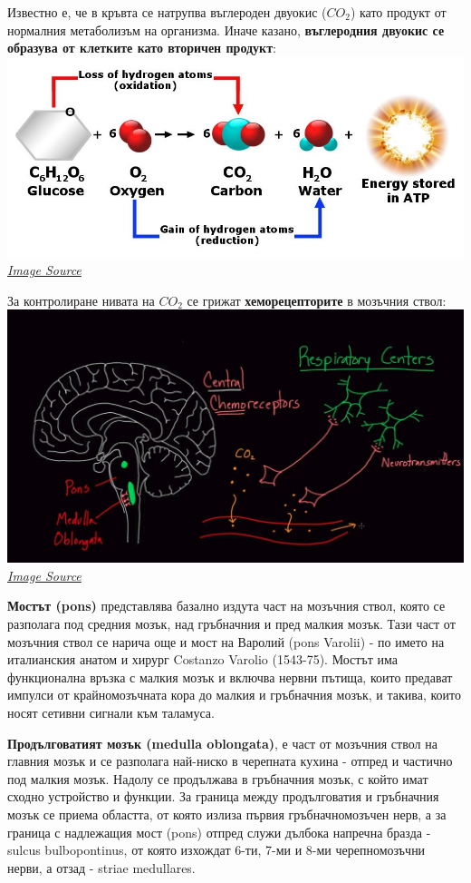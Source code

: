 \documentclass[11pt]{article}
\makeatletter
\def\maxwidth{\ifdim\Gin@nat@width>\linewidth\linewidth
    \else\Gin@nat@width\fi}
\let\Oldincludegraphics\includegraphics
\renewcommand{\includegraphics}[1]{\Oldincludegraphics[width=.8\maxwidth]{#1}}
\makeatother
\begin{document}
    Известно е, че в кръвта се натрупва въглероден двуокис (\(CO_2\)) като
продукт от нормалния метаболизъм на организма. Иначе казано,
\textbf{въглеродния двуокис се образува от клетките като вторичен
продукт}: \includegraphics{img/Reactions-of-Cellular-Respiration.jpg}
\emph{\href{https://www.scienceabc.com/humans/why-does-the-human-body-release-carbon-dioxide.html}{Image
Source}}

    За контролиране нивата на \(CO_2\) се грижат \textbf{хеморецепторите} в
мозъчния ствол:
\includegraphics{img/central_chemoreceptors_normal_CO2.jpg}
\emph{\href{https://www.youtube.com/watch?v=lVacrVMmJX8}{Image Source}}

    \textbf{Мостът (pons)} представлява базално издута част на мозъчния
ствол, която се разполага под средния мозък, над гръбначния и пред
малкия мозък. Тази част от мозъчния ствол се нарича още и мост на
Варолий (pons Varolii) - по името на италианския анатом и хирург
Costanzo Varolio (1543-75). Мостът има функционална връзка с малкия
мозък и включва нервни пътища, които предават импулси от крайномозъчната
кора до малкия и гръбначния мозък, и такива, които носят сетивни сигнали
към таламуса.

\textbf{Продълговатият мозък (medulla oblongata)}, е част от мозъчния
ствол на главния мозък и се разполага най-ниско в черепната кухина -
отпред и частично под малкия мозък. Надолу се продължава в гръбначния
мозък, с който имат сходно устройство и функции. За граница между
продълговатия и гръбначния мозък се приема областта, от която излиза
първия гръбначномозъчен нерв, а за граница с надлежащия мост (pons)
отпред служи дълбока напречна бразда - sulcus bulbopontinus, от която
изхождат 6-ти, 7-ми и 8-ми черепномозъчни нерви, а отзад - striae
medullares.
\end{document}
